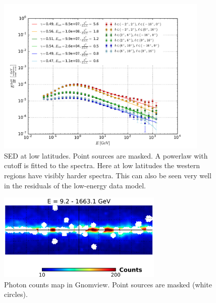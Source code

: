 \documentclass[a4paper]{article}
\begin{document}
\begin{figure}
	\centering
    \includegraphics[width = 0.90\textwidth]{SED.pdf}
    \caption{SED at low latitudes. Point sources are masked. A powerlaw with cutoff is fitted to the spectra. Here at low latitudes the western regions have visibly harder spectra. This can also be seen very well in the residuals of the low-energy data model.}
\end{figure} 

\begin{figure}
	\centering
    \includegraphics[width = 0.70\textwidth]{Gnomview9-1663GeV}
    \caption{Photon counts map in Gnomview. Point sources are masked (white circles).}
\end{figure} 
\end{document}
